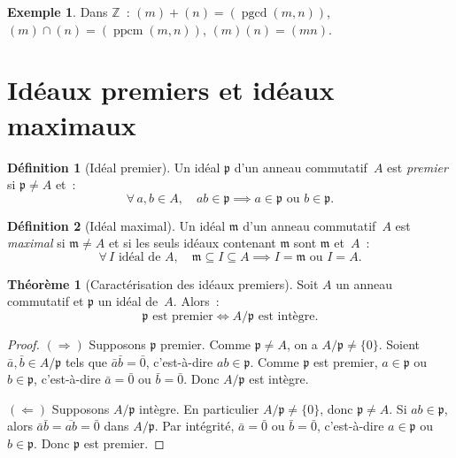 \documentclass[12pt,a4paper,openany]{book}
\theoremstyle{definition}
\newtheorem{definition}{Définition}[chapter]
\newtheorem{theoreme}{Théorème}[chapter]
\newtheorem{exemple}{Exemple}[chapter]
\newcommand{\Z}{\mathbb{Z}}
\DeclareMathOperator{\pgcd}{pgcd}
\DeclareMathOperator{\ppcm}{ppcm}
\begin{document}
\begin{exemple}\label{ex:operations-ideaux-Z}
Dans $\Z$~: $(m) + (n) = (\pgcd(m,n))$, \quad $(m) \cap (n) = (\ppcm(m,n))$,
\quad $(m)(n) = (mn)$.
\end{exemple}

\section{Idéaux premiers et idéaux maximaux}\label{sec:premiers-maximaux}

\begin{definition}[Idéal premier]\label{def:ideal-premier}
Un idéal $\mathfrak{p}$ d'un anneau commutatif~$A$ est \emph{premier}
si $\mathfrak{p} \neq A$ et~:
\[
  \forall\, a, b \in A, \quad ab \in \mathfrak{p}
  \implies a \in \mathfrak{p} \text{ ou } b \in \mathfrak{p}.
\]
\end{definition}

\begin{definition}[Idéal maximal]\label{def:ideal-maximal}
Un idéal $\mathfrak{m}$ d'un anneau commutatif~$A$ est \emph{maximal}
si $\mathfrak{m} \neq A$ et si les seuls idéaux contenant $\mathfrak{m}$
sont $\mathfrak{m}$ et~$A$~:
\[
  \forall\, I \text{ idéal de } A, \quad
  \mathfrak{m} \subseteq I \subseteq A
  \implies I = \mathfrak{m} \text{ ou } I = A.
\]
\end{definition}

\begin{theoreme}[Caractérisation des idéaux premiers]%
\label{thm:caract-premier}
Soit $A$ un anneau commutatif et $\mathfrak{p}$ un idéal de~$A$.
Alors~:
\[
  \mathfrak{p} \text{ est premier}
  \iff
  A/\mathfrak{p} \text{ est intègre}.
\]
\end{theoreme}

\begin{proof}
$(\Rightarrow)$\; Supposons $\mathfrak{p}$ premier. Comme
$\mathfrak{p} \neq A$, on a $A/\mathfrak{p} \neq \{0\}$. Soient
$\bar{a}, \bar{b} \in A/\mathfrak{p}$ tels que $\bar{a}\bar{b} = \bar{0}$,
c'est-à-dire $ab \in \mathfrak{p}$. Comme $\mathfrak{p}$ est premier,
$a \in \mathfrak{p}$ ou $b \in \mathfrak{p}$, c'est-à-dire $\bar{a} = \bar{0}$
ou $\bar{b} = \bar{0}$. Donc $A/\mathfrak{p}$ est intègre.

$(\Leftarrow)$\; Supposons $A/\mathfrak{p}$ intègre. En particulier
$A/\mathfrak{p} \neq \{0\}$, donc $\mathfrak{p} \neq A$. Si
$ab \in \mathfrak{p}$, alors $\bar{a}\bar{b} = \overline{ab} = \bar{0}$
dans $A/\mathfrak{p}$. Par intégrité, $\bar{a} = \bar{0}$ ou
$\bar{b} = \bar{0}$, c'est-à-dire $a \in \mathfrak{p}$ ou
$b \in \mathfrak{p}$. Donc $\mathfrak{p}$ est premier.
\end{proof}
\end{document}

